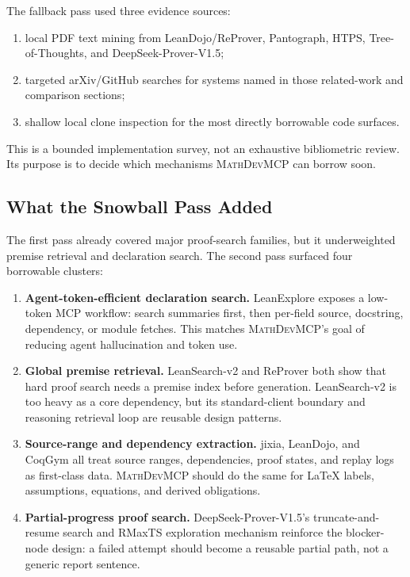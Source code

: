 \documentclass[11pt]{article}
\newcommand{\MathDevMCP}{\textsc{MathDevMCP}}
\begin{document}
The fallback pass used three evidence sources:

\begin{enumerate}[leftmargin=*]
\item local PDF text mining from LeanDojo/ReProver, Pantograph, HTPS,
  Tree-of-Thoughts, and DeepSeek-Prover-V1.5;
\item targeted arXiv/GitHub searches for systems named in those related-work
  and comparison sections;
\item shallow local clone inspection for the most directly borrowable code
  surfaces.
\end{enumerate}

This is a bounded implementation survey, not an exhaustive bibliometric review.
Its purpose is to decide which mechanisms \MathDevMCP{} can borrow soon.

\subsection{What the Snowball Pass Added}

The first pass already covered major proof-search families, but it underweighted
premise retrieval and declaration search. The second pass surfaced four
borrowable clusters:

\begin{enumerate}[leftmargin=*]
\item \textbf{Agent-token-efficient declaration search.} LeanExplore exposes a
  low-token MCP workflow: search summaries first, then per-field source,
  docstring, dependency, or module fetches. This matches \MathDevMCP{}'s goal of
  reducing agent hallucination and token use.
\item \textbf{Global premise retrieval.} LeanSearch-v2 and ReProver both show
  that hard proof search needs a premise index before generation. LeanSearch-v2
  is too heavy as a core dependency, but its standard-client boundary and
  reasoning retrieval loop are reusable design patterns.
\item \textbf{Source-range and dependency extraction.} jixia, LeanDojo, and
  CoqGym all treat source ranges, dependencies, proof states, and replay logs as
  first-class data. \MathDevMCP{} should do the same for LaTeX labels,
  assumptions, equations, and derived obligations.
\item \textbf{Partial-progress proof search.} DeepSeek-Prover-V1.5's
  truncate-and-resume search and RMaxTS exploration mechanism reinforce the
  blocker-node design: a failed attempt should become a reusable partial path,
  not a generic report sentence.
\end{enumerate}
\end{document}
